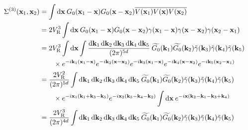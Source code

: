 \begin{align}
\Sigma^{(3)}(\mathbf{x}_{\mathrm{1}},\mathbf{x}_{\mathrm{2}}) &= \int{\diff \mathbf{x} \: G_0(\mathbf{x}_{\mathrm{1}} - \mathbf{x}) G_0(\mathbf{x}-\mathbf{x}_{\mathrm{2}}) \overline{V(\mathbf{x}_{\mathrm{1}})V(\mathbf{x})V(\mathbf{x}_{\mathrm{2}})}} \\
&=2 \VR^3 \int{\diff\mathbf{x} \: G_0(\mathbf{x}_{\mathrm{1}} - \mathbf{x}) G_0(\mathbf{x}-\mathbf{x}_{\mathrm{2}}) \gamma(\mathbf{x}_{\mathrm{1}}-\mathbf{x})\gamma(\mathbf{x}-\mathbf{x}_{\mathrm{2}})\gamma(\mathbf{x}_{\mathrm{2}}-\mathbf{x}_{\mathrm{1}})} \\
&=2 \VR^3 \int{\diff\mathbf{x} \int{\frac{\diff\mathbf{k}_{\mathrm{1}}\diff\mathbf{k}_{\mathrm{2}}\diff\mathbf{k}_{\mathrm{3}}\diff\mathbf{k}_{\mathrm{4}}\diff\mathbf{k}_{\mathrm{5}}}{(2\pi)^{5d}}\: \widetilde{G_0}(\mathbf{k}_{\mathrm{1}}) \widetilde{G_0}(\mathbf{k}_{\mathrm{2}}) \tilde{\gamma}(\mathbf{k}_{\mathrm{3}})\tilde{\gamma}(\mathbf{k}_{\mathrm{4}})\tilde{\gamma}(\mathbf{k}_{\mathrm{5}}) }} \\
&\nonumber \qquad\times e^{-i\mathbf{k}_{\mathrm{1}}(\mathbf{x}_{\mathrm{1}}-\mathbf{x})} e^{-i\mathbf{k}_{\mathrm{2}}(\mathbf{x}-\mathbf{x}_{\mathrm{2}})} e^{-i\mathbf{k}_{\mathrm{3}}(\mathbf{x}_{\mathrm{1}}-\mathbf{x})} e^{-i\mathbf{k}_{\mathrm{4}}(\mathbf{x}-\mathbf{x}_{\mathrm{2}})} e^{-i\mathbf{k}_{\mathrm{5}}(\mathbf{x}_{\mathrm{2}}-\mathbf{x}_{\mathrm{1}})} \\
&= \frac{2\VR^2}{(2\pi)^{5d}} \int{\diff\mathbf{k}_{\mathrm{1}}\diff\mathbf{k}_{\mathrm{2}}\diff\mathbf{k}_{\mathrm{3}}\diff\mathbf{k}_{\mathrm{4}}\diff\mathbf{k}_{\mathrm{5}}\: \widetilde{G_0}(\mathbf{k}_{\mathrm{1}}) \widetilde{G_0}(\mathbf{k}_{\mathrm{2}}) \tilde{\gamma}(\mathbf{k}_{\mathrm{3}})\tilde{\gamma}(\mathbf{k}_{\mathrm{4}})\tilde{\gamma}(\mathbf{k}_{\mathrm{5}})}\\
&\nonumber \qquad \times e^{-i\mathbf{x}_{\mathrm{1}} (\mathbf{k}_{\mathrm{1}}+\mathbf{k}_{\mathrm{3}}-\mathbf{k}_{\mathrm{5}})} e^{-i\mathbf{x}_{\mathrm{2}}(\mathbf{k}_{\mathrm{5}}-\mathbf{k}_{\mathrm{4}}-\mathbf{k}_{\mathrm{2}})} \int{\diff\mathbf{x}\: e^{-i\mathbf{x}(\mathbf{k}_{\mathrm{2}}-\mathbf{k}_{\mathrm{1}}-\mathbf{k}_{\mathrm{3}}+\mathbf{k}_{\mathrm{4}})}}\\
&=\frac{2\VR^3}{(2\pi)^{4d}} \int{\diff\mathbf{k}_{\mathrm{1}}\diff\mathbf{k}_{\mathrm{2}}\diff\mathbf{k}_{\mathrm{3}}\diff\mathbf{k}_{\mathrm{4}}\diff\mathbf{k}_{\mathrm{5}}\: \widetilde{G_0}(\mathbf{k}_{\mathrm{1}}) \widetilde{G_0}(\mathbf{k}_{\mathrm{2}}) \tilde{\gamma}(\mathbf{k}_{\mathrm{3}})\tilde{\gamma}(\mathbf{k}_{\mathrm{4}})\tilde{\gamma}(\mathbf{k}_{\mathrm{5}})}\\

\end{align}

